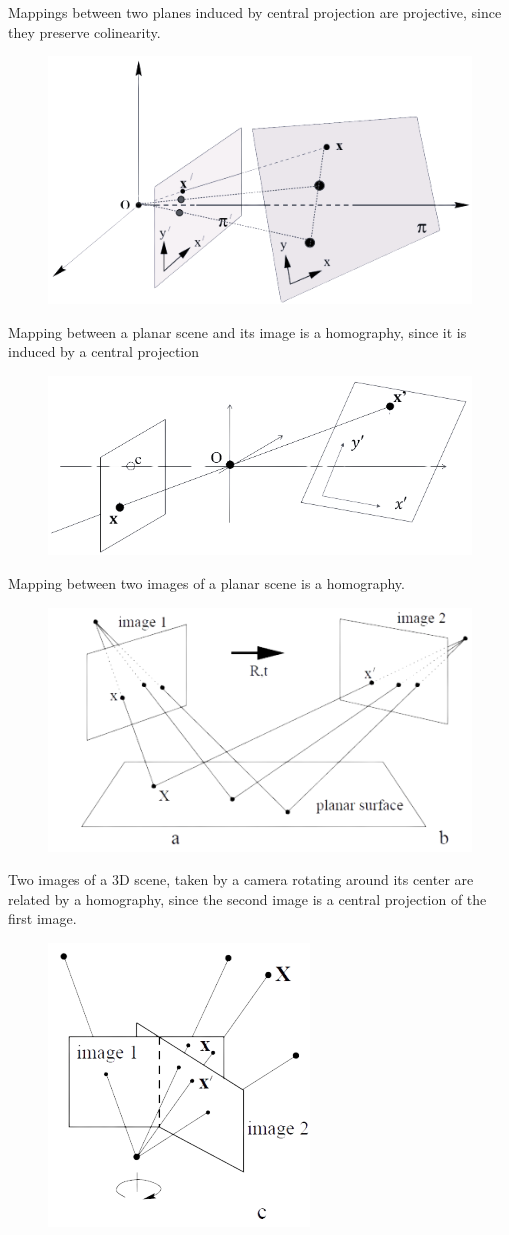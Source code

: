 \documentclass[12pt, a4paper]{report}
\begin{document}
    \begin{example}
        Mappings between two planes induced by central projection are projective, since they preserve colinearity. 
        \begin{figure}[H]
            \centering
            \includegraphics[width=0.5\linewidth]{images/map1.png}
        \end{figure}
        Mapping between a planar scene and its image is a homography, since it is induced by a central projection
        \begin{figure}[H]
            \centering
            \includegraphics[width=0.5\linewidth]{images/map2.png}
        \end{figure}
        Mapping between two images of a planar scene is a homography.
        \begin{figure}[H]
            \centering
            \includegraphics[width=0.5\linewidth]{images/map3.png}
        \end{figure}
        Two images of a 3D scene, taken by a camera rotating around its center are related by a homography, since the second image is a central projection of the first image. 
        \begin{figure}[H]
            \centering
            \includegraphics[width=0.4\linewidth]{images/map4.png}

\end{figure}
\end{example}
\end{document}
